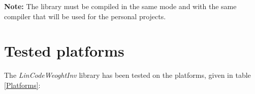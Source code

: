 	\textbf{Note:} The library must be compiled in the same mode and with the same compiler that will be used for the personal projects.
	
	\section{Tested platforms}
	The \emph{LinCodeWeoghtInv} library has been tested on the platforms, given in table \ref{Platforms}:\\

